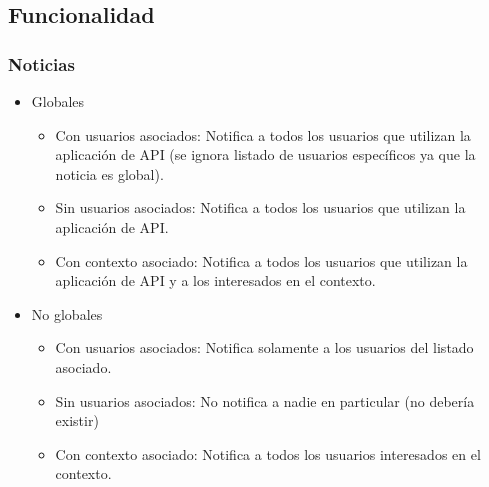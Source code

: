 \subsection{Funcionalidad}
\label{funcionalidad}


\subsubsection{Noticias}
\label{funcionalidad_noticias}

\begin{itemize}
\item Globales
\begin{itemize}
\item Con usuarios asociados: Notifica a todos los usuarios que utilizan la aplicación de API (se ignora listado de usuarios específicos ya que la noticia es global).
\item Sin usuarios asociados: Notifica a todos los usuarios que utilizan la aplicación de API.
\item Con contexto asociado: Notifica a todos los usuarios que utilizan la aplicación de API y a los interesados en el contexto.
\end{itemize}
\item No globales
\begin{itemize}
\item Con usuarios asociados: Notifica solamente a los usuarios del listado asociado.
\item Sin usuarios asociados: No notifica a nadie en particular (no debería existir)
\item Con contexto asociado: Notifica a todos los usuarios interesados en el contexto.
\end{itemize}
\end{itemize}
